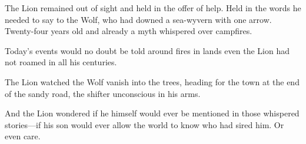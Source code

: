 The Lion remained out of sight and held in the offer of help.
Held in the words he needed to say to the Wolf, who had downed a sea-wyvern with one arrow.
Twenty-four years old and already a myth whispered over campfires.

Today's events would no doubt be told around fires in lands even the Lion had not roamed in all his centuries.

The Lion watched the Wolf vanish into the trees, heading for the town at the end of the sandy road, the shifter unconscious in his arms.

And the Lion wondered if he himself would ever be mentioned in those whispered stories---if his son would ever allow the world to know who had sired him.
Or even care.
